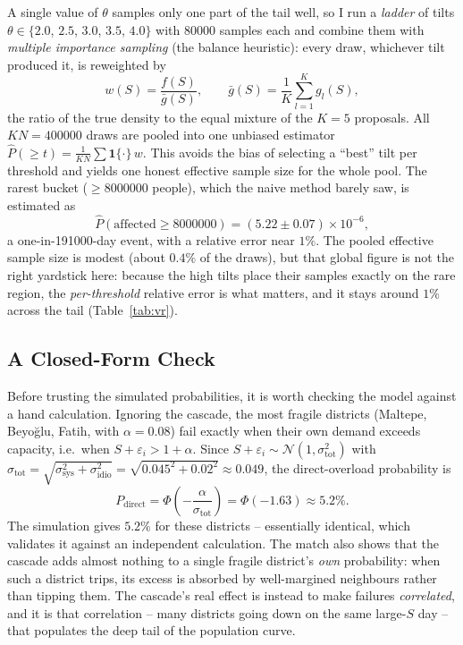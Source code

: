 \documentclass[11pt,a4paper]{article}
\begin{document}
A single value of $\theta$ samples only one part of the tail well, so I run a
\emph{ladder} of tilts $\theta \in \{2.0$, $2.5$, $3.0$, $3.5$, $4.0\}$ with \num{80000}
samples each and combine them with \emph{multiple importance sampling} (the
balance heuristic): every draw, whichever tilt produced it, is reweighted by
\begin{equation}
    w(S) = \frac{f(S)}{\bar{g}(S)}, \qquad
    \bar{g}(S) = \frac{1}{K}\sum_{l=1}^{K} g_l(S),
\end{equation}
the ratio of the true density to the equal mixture of the $K=5$ proposals. All
$KN = \num{400000}$ draws are pooled into one unbiased estimator
$\hat{P}(\ge t) = \tfrac{1}{KN}\sum \mathbf{1}\{\cdot\}\, w$. This avoids the bias
of selecting a ``best'' tilt per threshold and yields one honest effective sample
size for the whole pool. The rarest bucket ($\ge \num{8000000}$ people), which the
naive method barely saw, is estimated as
\begin{equation}
    \hat{P}(\text{affected} \ge \num{8000000}) = (5.22 \pm 0.07)\times 10^{-6},
\end{equation}
a one-in-\num{191000}-day event, with a relative error near $1\%$. The pooled
effective sample size is modest (about $0.4\%$ of the draws), but that global
figure is not the right yardstick here: because the high tilts place their samples
exactly on the rare region, the \emph{per-threshold} relative error is what
matters, and it stays around $1\%$ across the tail (Table~\ref{tab:vr}).

\subsection{A Closed-Form Check}

Before trusting the simulated probabilities, it is worth checking the model
against a hand calculation. Ignoring the cascade, the most fragile districts
(Maltepe, Beyoğlu, Fatih, with $\alpha = 0.08$) fail exactly when their own demand
exceeds capacity, i.e.\ when $S + \varepsilon_i > 1 + \alpha$. Since
$S + \varepsilon_i \sim \mathcal{N}(1, \sigma_{\text{tot}}^2)$ with
$\sigma_{\text{tot}} = \sqrt{\sigma_{\text{sys}}^2 + \sigma_{\text{idio}}^2}
= \sqrt{0.045^2 + 0.02^2} \approx 0.049$, the direct-overload probability is
\begin{equation}
    P_{\text{direct}} = \Phi\!\left(-\frac{\alpha}{\sigma_{\text{tot}}}\right)
    = \Phi(-1.63) \approx 5.2\%.
\end{equation}
The simulation gives $5.2\%$ for these districts -- essentially identical, which
validates it against an independent calculation. The match also shows that the
cascade adds almost nothing to a single fragile district's \emph{own} probability:
when such a district trips, its excess is absorbed by well-margined neighbours
rather than tipping them. The cascade's real effect is instead to make failures
\emph{correlated}, and it is that correlation -- many districts going down on the
same large-$S$ day -- that populates the deep tail of the population curve.
\end{document}

